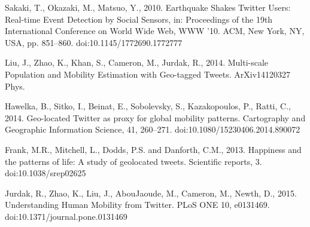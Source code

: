 \documentclass[a4paper,11pt]{article}
\begin{document}
\begin{thebibliography}{10}

Sakaki, T., Okazaki, M., Matsuo, Y., 2010. Earthquake Shakes Twitter Users: Real-time Event Detection by Social Sensors, in: Proceedings of the 19th International Conference on World Wide Web, WWW ’10. ACM, New York, NY, USA, pp. 851–860. doi:10.1145/1772690.1772777

Liu, J., Zhao, K., Khan, S., Cameron, M., Jurdak, R., 2014. Multi-scale Population and Mobility Estimation with Geo-tagged Tweets. ArXiv14120327 Phys.


Hawelka, B., Sitko, I., Beinat, E., Sobolevsky, S., Kazakopoulos, P., Ratti, C., 2014. Geo-located Twitter as proxy for global mobility patterns. Cartography and Geographic Information Science, 41, 260–271. doi:10.1080/15230406.2014.890072

Frank, M.R., Mitchell, L., Dodds, P.S. and Danforth, C.M., 2013. Happiness and the patterns of life: A study of geolocated tweets. Scientific reports, 3. doi:10.1038/srep02625

Jurdak, R., Zhao, K., Liu, J., AbouJaoude, M., Cameron, M., Newth, D., 2015. Understanding Human Mobility from Twitter. PLoS ONE 10, e0131469. doi:10.1371/journal.pone.0131469



\end{thebibliography}
\end{document}
